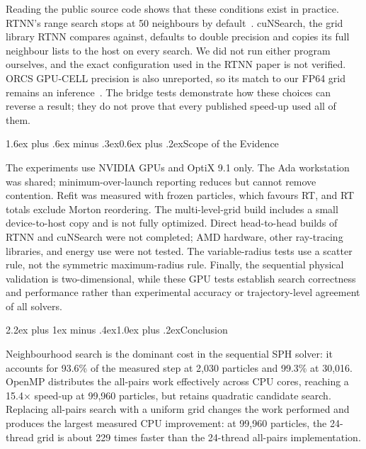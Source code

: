 \documentclass[conference]{IEEEtran}
\makeatletter
\renewcommand\section{\@startsection{section}{1}{\z@}%
  {2.2ex plus 1ex minus .4ex}{1.0ex plus .2ex}{\normalfont\large\bfseries}}
\renewcommand\subsection{\@startsection{subsection}{2}{\z@}%
  {1.6ex plus .6ex minus .3ex}{0.6ex plus .2ex}{\normalfont\normalsize\bfseries}}
\makeatother
\begin{document}
Reading the public source code shows that these conditions exist in practice. RTNN's range search stops at 50 neighbours by default~\cite{zhu2022rtnn}. cuNSearch, the grid library RTNN compares against, defaults to double precision and copies its full neighbour lists to the host on every search. We did not run either program ourselves, and the exact configuration used in the RTNN paper is not verified. ORCS GPU-CELL precision is also unreported, so its match to our FP64 grid remains an inference~\cite{meneses2026rtnn}. The bridge tests demonstrate how these choices can reverse a result; they do not prove that every published speed-up used all of them.

\subsection{Scope of the Evidence}

The experiments use NVIDIA GPUs and OptiX 9.1 only. The Ada workstation was shared; minimum-over-launch reporting reduces but cannot remove contention. Refit was measured with frozen particles, which favours RT, and RT totals exclude Morton reordering. The multi-level-grid build includes a small device-to-host copy and is not fully optimized. Direct head-to-head builds of RTNN and cuNSearch were not completed; AMD hardware, other ray-tracing libraries, and energy use were not tested. The variable-radius tests use a scatter rule, not the symmetric maximum-radius rule. Finally, the sequential physical validation is two-dimensional, while these GPU tests establish search correctness and performance rather than experimental accuracy or trajectory-level agreement of all solvers.

\section{Conclusion}\label{sec:conclusion}

Neighbourhood search is the dominant cost in the sequential SPH solver: it accounts for 93.6\% of the measured step at 2,030 particles and 99.3\% at 30,016. OpenMP distributes the all-pairs work effectively across CPU cores, reaching a 15.4$\times$ speed-up at 99,960 particles, but retains quadratic candidate search. Replacing all-pairs search with a uniform grid changes the work performed and produces the largest measured CPU improvement: at 99,960 particles, the 24-thread grid is about 229 times faster than the 24-thread all-pairs implementation.
\end{document}
